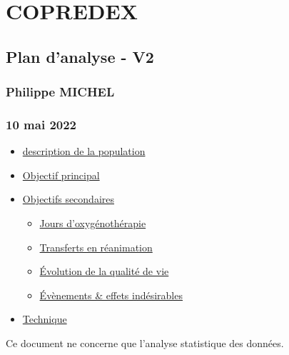 \hypertarget{copredex}{%
\section{COPREDEX}\label{copredex}}

\hypertarget{plan-danalyse---v2}{%
\subsection{Plan d'analyse - V2}\label{plan-danalyse---v2}}

\hypertarget{philippe-michel}{%
\subsubsection{Philippe MICHEL}\label{philippe-michel}}

\hypertarget{mai-2022}{%
\subsubsection{10 mai 2022}\label{mai-2022}}

\hypertarget{TOC}{}
\begin{itemize}
\tightlist
\item
  \protect\hyperlink{description-de-la-population}{description de la
  population}
\item
  \protect\hyperlink{objectif-principal}{Objectif principal}
\item
  \protect\hyperlink{objectifs-secondaires}{Objectifs secondaires}

  \begin{itemize}
  \tightlist
  \item
    \protect\hyperlink{jours-doxyguxe9nothuxe9rapie}{Jours
    d'oxygénothérapie}
  \item
    \protect\hyperlink{transferts-en-ruxe9animation}{Transferts en
    réanimation}
  \item
    \protect\hyperlink{uxe9volution-de-la-qualituxe9-de-vie}{Évolution
    de la qualité de vie}
  \item
    \protect\hyperlink{uxe9vuxe8nements-effets-induxe9sirables}{Évènements
    \& effets indésirables}
  \end{itemize}
\item
  \protect\hyperlink{technique}{Technique}
\end{itemize}

\hypertarget{content-wrapper}{}
\leavevmode\hypertarget{main-content}{}%
Ce document ne concerne que l'analyse statistique des données.

